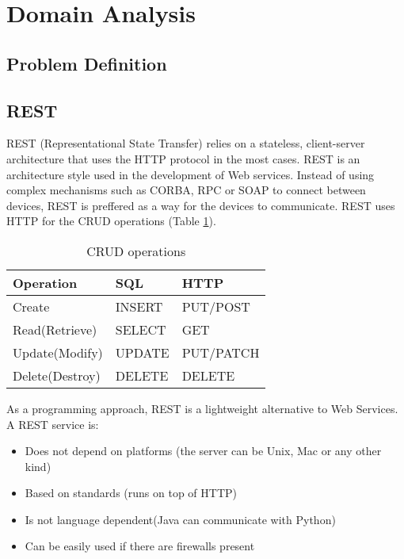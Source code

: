 \section{Domain Analysis}

\subsection{Problem Definition}

\subsection{REST}
REST (Representational State Transfer) relies on a stateless, client-server architecture that uses the HTTP protocol in the most cases.
REST is an architecture style used in the development of Web services. Instead of using complex mechanisms such as CORBA, RPC or SOAP to connect between devices, REST is preffered as a way for the devices to communicate.
REST uses HTTP for the CRUD operations (Table \ref{crud_operations}).
\begin{table}[ht!]
\centering
\caption{CRUD operations}
{
\renewcommand{\arraystretch}{1.25}
\begin{tabular}{ lll }

  Operation & SQL & HTTP \\ \hline
  Create &  INSERT & PUT/POST \\
  Read(Retrieve) & SELECT & GET \\
  Update(Modify) & UPDATE & PUT/PATCH \\
  Delete(Destroy) & DELETE & DELETE \\

\end{tabular}
}
\label{crud_operations}
\end{table}

As a programming approach, REST is a lightweight alternative to Web Services.
A REST service is:
\begin{itemize}
  \item Does not depend on platforms (the server can be Unix, Mac or any other kind)
  \item Based on standards (runs on top of HTTP)
  \item Is not language dependent(Java can communicate with Python)
  \item Can be easily used if there are firewalls present
\end{itemize}

